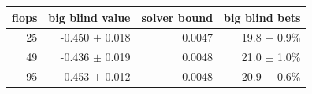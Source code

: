 \begin{tabular}{rrrr}
\toprule
flops & big blind value & solver bound & big blind bets \\ \midrule
25 & -0.450 $\pm$ 0.018 & 0.0047 & 19.8 $\pm$ 0.9\% \\
49 & -0.436 $\pm$ 0.019 & 0.0048 & 21.0 $\pm$ 1.0\% \\
95 & -0.453 $\pm$ 0.012 & 0.0048 & 20.9 $\pm$ 0.6\% \\
\bottomrule
\end{tabular}
